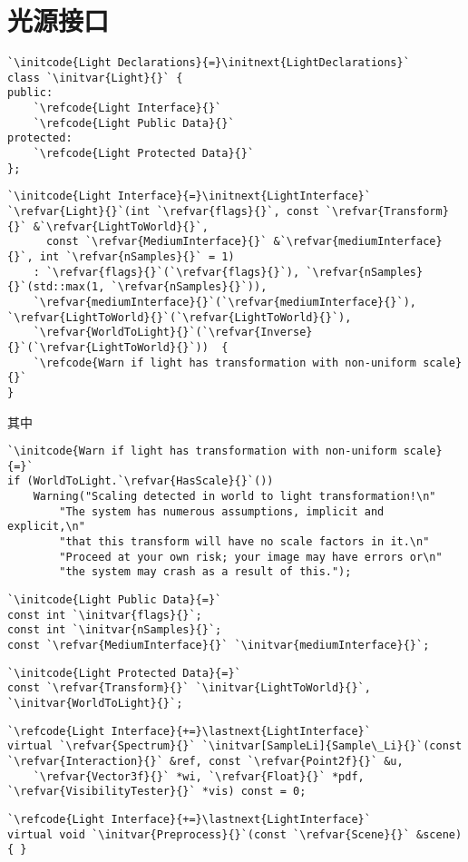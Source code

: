 \section{光源接口}\label{sec:光源接口}

\begin{lstlisting}
`\initcode{Light Declarations}{=}\initnext{LightDeclarations}`
class `\initvar{Light}{}` {
public:
    `\refcode{Light Interface}{}`
    `\refcode{Light Public Data}{}`
protected:
    `\refcode{Light Protected Data}{}`
};
\end{lstlisting}

\begin{lstlisting}
`\initcode{Light Interface}{=}\initnext{LightInterface}`
`\refvar{Light}{}`(int `\refvar{flags}{}`, const `\refvar{Transform}{}` &`\refvar{LightToWorld}{}`,
      const `\refvar{MediumInterface}{}` &`\refvar{mediumInterface}{}`, int `\refvar{nSamples}{}` = 1)
    : `\refvar{flags}{}`(`\refvar{flags}{}`), `\refvar{nSamples}{}`(std::max(1, `\refvar{nSamples}{}`)),
    `\refvar{mediumInterface}{}`(`\refvar{mediumInterface}{}`), `\refvar{LightToWorld}{}`(`\refvar{LightToWorld}{}`),
    `\refvar{WorldToLight}{}`(`\refvar{Inverse}{}`(`\refvar{LightToWorld}{}`))  { 
    `\refcode{Warn if light has transformation with non-uniform scale}{}`
}
\end{lstlisting}
其中
\begin{lstlisting}
`\initcode{Warn if light has transformation with non-uniform scale}{=}`
if (WorldToLight.`\refvar{HasScale}{}`())
    Warning("Scaling detected in world to light transformation!\n"
        "The system has numerous assumptions, implicit and explicit,\n"
        "that this transform will have no scale factors in it.\n"
        "Proceed at your own risk; your image may have errors or\n"
        "the system may crash as a result of this.");
\end{lstlisting}
\begin{lstlisting}
`\initcode{Light Public Data}{=}`
const int `\initvar{flags}{}`;
const int `\initvar{nSamples}{}`;
const `\refvar{MediumInterface}{}` `\initvar{mediumInterface}{}`;
\end{lstlisting}

\begin{lstlisting}
`\initcode{Light Protected Data}{=}`
const `\refvar{Transform}{}` `\initvar{LightToWorld}{}`, `\initvar{WorldToLight}{}`;
\end{lstlisting}
\begin{lstlisting}
`\refcode{Light Interface}{+=}\lastnext{LightInterface}`
virtual `\refvar{Spectrum}{}` `\initvar[SampleLi]{Sample\_Li}{}`(const `\refvar{Interaction}{}` &ref, const `\refvar{Point2f}{}` &u,
    `\refvar{Vector3f}{}` *wi, `\refvar{Float}{}` *pdf, `\refvar{VisibilityTester}{}` *vis) const = 0;
\end{lstlisting}
\begin{lstlisting}
`\refcode{Light Interface}{+=}\lastnext{LightInterface}`
virtual void `\initvar{Preprocess}{}`(const `\refvar{Scene}{}` &scene) { }
\end{lstlisting}

